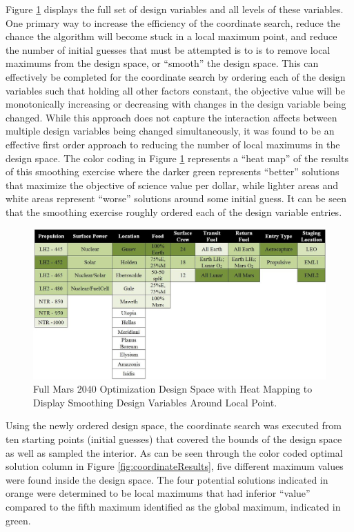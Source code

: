 \documentclass[]{aiaa-pretty}
\begin{document}
Figure \ref{fig:heatmap} displays the full set of design variables and all levels of these variables. One primary way to increase the efficiency of the coordinate search, reduce the chance the algorithm will become stuck in a local maximum point, and reduce the number of initial guesses that must be attempted is to is to remove local maximums from the design space, or “smooth” the design space. This can effectively be completed for the coordinate search by ordering each of the design variables such that holding all other factors constant, the objective value will be monotonically increasing or decreasing with changes in the design variable being changed. While this approach does not capture the interaction affects between multiple design variables being changed simultaneously, it was found to be an effective first order approach to reducing the number of local maximums in the design space. The color coding in Figure \ref{fig:heatmap} represents a “heat map” of the results of this smoothing exercise where the darker green represents “better” solutions that maximize the objective of science value per dollar, while lighter areas and white areas represent “worse” solutions around some initial guess. It can be seen that the smoothing exercise roughly ordered each of the design variable entries.

\begin{figure}[ht!]
	\centering
	\includegraphics[width=1\textwidth]{DesignSpaceHeatMap}
	\caption{Full Mars 2040 Optimization Design Space with Heat Mapping to Display Smoothing Design Variables Around Local Point.}
	\label{fig:heatmap}
\end{figure}

Using the newly ordered design space, the coordinate search was executed from ten starting points (initial guesses) that covered the bounds of the design space as well as sampled the interior. As can be seen through the color coded optimal solution column in Figure \ref{fig:coordinateResults}, five different maximum values were found inside the design space. The four potential solutions indicated in orange were determined to be local maximums that had inferior ``value'' compared to the fifth maximum identified as the global maximum, indicated in green.
\end{document}
